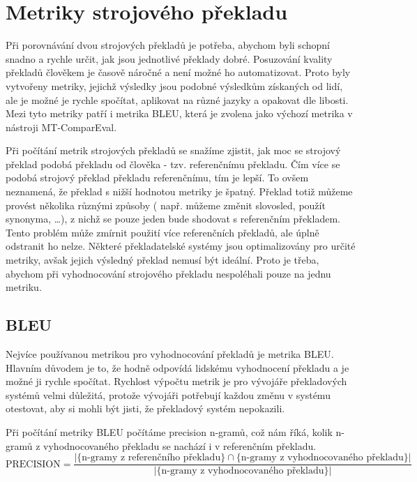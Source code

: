 \chapter{Metriky strojového překladu}
\label{chap:metrics}

Při porovnávání dvou strojových překladů je potřeba,
  abychom byli schopní snadno a rychle určit,
  jak jsou jednotlivé překlady dobré.
Posuzování kvality překladů člověkem je časově náročné
  a není možné ho automatizovat.
Proto byly vytvořeny metriky,
  jejichž výsledky jsou podobné výsledkům získaných od lidí,
  ale je možné je rychle spočítat,
  aplikovat na různé jazyky a opakovat dle libosti.
Mezi tyto metriky patří i metrika BLEU,
  která je zvolena jako výchozí metrika v nástroji MT-ComparEval.

Při počítání metrik strojových překladů se snažíme zjistit,
  jak moc se strojový překlad podobá překladu od člověka - tzv. referenčnímu překladu.
Čím více se podobá strojový překlad překladu referenčnímu,
  tím je lepší.
To ovšem neznamená, že překlad s nižší hodnotou metriky je špatný.
Překlad totiž můžeme provést několika různými způsoby 
  ( např. můžeme změnit slovosled, použít synonyma, \dots ),
  z nichž se pouze jeden bude shodovat s referenčním překladem.
Tento problém může zmírnit použití více referenčních překladů,
  ale úplně odstranit ho nelze.
Některé překladatelské systémy jsou optimalizovány pro určité metriky,
  avšak jejich výsledný překlad nemusí být ideální.
Proto je třeba,
  abychom při vyhodnocování strojového překladu nespoléhali pouze na jednu metriku.


\section{BLEU}
Nejvíce používanou metrikou pro vyhodnocování překladů je metrika BLEU.
Hlavním důvodem je to,
  že hodně odpovídá lidskému vyhodnocení překladu
  a je možné ji rychle spočítat.
Rychlost výpočtu metrik je pro vývojáře překladových systémů velmi důležitá,
  protože vývojáři potřebují každou změnu v systému otestovat,
  aby si mohli být jisti,
  že překladový systém nepokazili.

Při počítání metriky BLEU počítáme precision n-gramů,
  což nám říká,
  kolik n-gramů z vyhodnocovaného překladu se nachází i v referenčním překladu.	
$$ \text{PRECISION} = \frac{\lvert \lbrace \text{n-gramy z referenčního překladu} \rbrace \cap \lbrace \text{n-gramy z vyhodnocovaného překladu} \rbrace \rvert}{\lvert \lbrace \text{n-gramy z vyhodnocovaného překladu} \rbrace \rvert}$$

